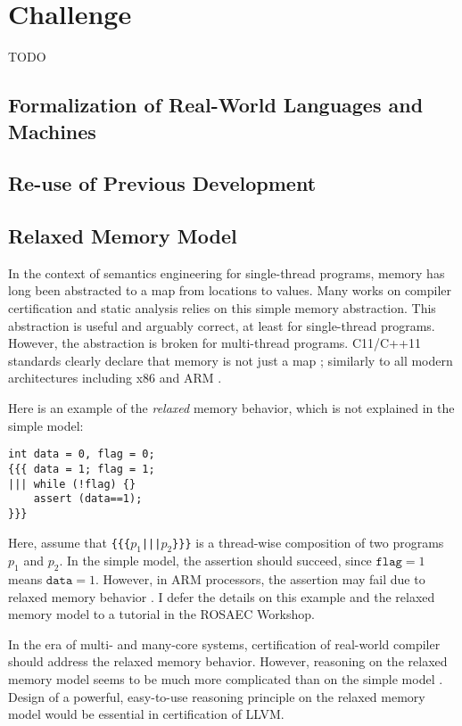 \documentclass[nocopyrightspace]{sigplanconf}
\begin{document}
\section{Challenge}
TODO

\subsection{Formalization of Real-World Languages and Machines}

\subsection{Re-use of Previous Development}

\subsection{Relaxed Memory Model}
In the context of semantics engineering for single-thread programs,
memory has long been abstracted to a map from locations to values.
Many works on compiler certification and static analysis relies on
this simple memory abstraction.  This abstraction is useful and
arguably correct, at least for single-thread programs.  However, the
abstraction is broken for multi-thread programs.  C11/C++11 standards
clearly declare that memory is not just a map \cite{TODO}; similarly
to all modern architectures including x86 \cite{TODO} and ARM
\cite{TODO}.

Here is an example of the \emph{relaxed} memory behavior, which is not
explained in the simple model:
\begin{verbatim}
int data = 0, flag = 0;
{{{ data = 1; flag = 1;
||| while (!flag) {}
    assert (data==1);
}}}
\end{verbatim}
Here, assume that \texttt{\{\{\{$p_1$|||$p_2$\}\}\}} is a thread-wise
composition of two programs $p_1$ and $p_2$.  In the simple model, the
assertion should succeed, since $\texttt{flag}=1$ means
$\texttt{data}=1$.  However, in ARM processors, the assertion may fail
due to relaxed memory behavior \cite{TODO}.  I defer the details on
this example and the relaxed memory model to a tutorial in the ROSAEC
Workshop.

In the era of multi- and many-core systems, certification of
real-world compiler should address the relaxed memory behavior.
However, reasoning on the relaxed memory model seems to be much more
complicated than on the simple model \cite{TODO}.  Design of a
powerful, easy-to-use reasoning principle on the relaxed memory model
would be essential in certification of LLVM.
\end{document}
